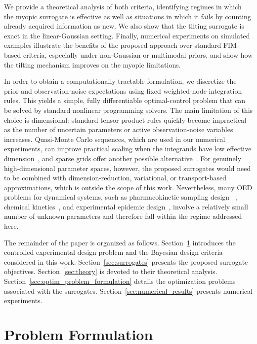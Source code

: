 \documentclass[a4paper,11pt]{article}
\begin{document}
We provide a theoretical analysis of both criteria, identifying regimes in which the myopic surrogate is effective as well as situations in which it fails by counting already acquired information as new. We also show that the tilting surrogate is exact in the linear-Gaussian setting. Finally, numerical experiments on simulated examples illustrate the benefits of the proposed approach over standard FIM-based criteria, especially under non-Gaussian or multimodal priors, and show how the tilting mechanism improves on the myopic limitations.

In order to obtain a computationally tractable formulation, we discretize the
prior and observation-noise expectations using fixed weighted-node integration
rules. This yields a simple, fully differentiable optimal-control problem that
can be solved by standard nonlinear programming solvers. The main limitation
of this choice is dimensional: standard tensor-product rules quickly become
impractical as the number of uncertain parameters or active observation-noise
variables increases. Quasi-Monte Carlo sequences, which are used in our
numerical experiments, can improve practical scaling when the
integrands have low effective dimension~\cite{dick2013high}, and sparse grids
offer another possible alternative~\cite{bungartz2004sparse}. For 
genuinely high-dimensional parameter spaces, however, the proposed surrogates
would need to be combined with dimension-reduction, variational, or
transport-based approximations, which is outside the scope of this work.
Nevertheless, many OED problems for dynamical systems, such as pharmacokinetic sampling design ~\cite{mentre1997optimal}, chemical kinetics~\cite{korkel2004numerical}, and experimental epidemic design~\cite{pagendam2013optimal}, involve a relatively small number of unknown parameters and therefore fall within the regime addressed here.


The remainder of the paper is organized as follows. Section~\ref{sec:problem_formulation} introduces the controlled experimental design problem and the Bayesian design criteria considered in this work. Section~\ref{sec:surrogates} presents the proposed surrogate objectives. Section~\ref{sec:theory} is devoted to their theoretical analysis. Section~\ref{sec:optim_problem_formulation} details the optimization problems associated with the surrogates. Section~\ref{sec:numerical_results} presents numerical experiments.


\section{Problem Formulation}\label{sec:problem_formulation}
\end{document}
